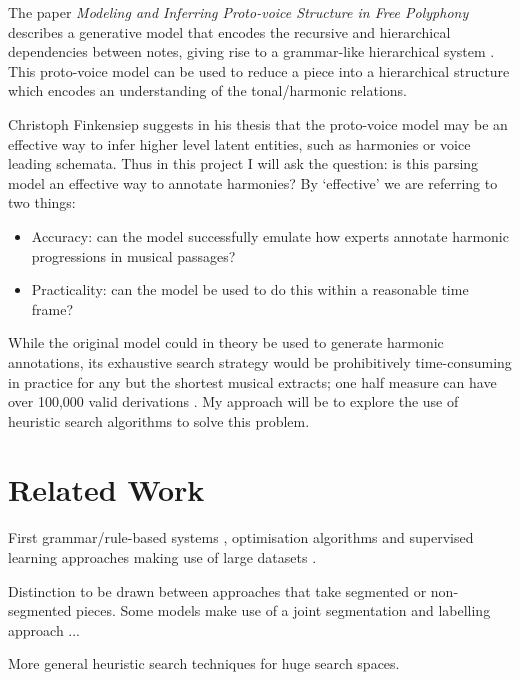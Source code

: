\documentclass[12pt,a4paper,twoside,openright]{report}
\begin{document}
\par
The paper \textit{Modeling and Inferring Proto-voice Structure in Free Polyphony} describes a generative model that encodes the recursive and hierarchical dependencies between notes, giving rise to a grammar-like hierarchical system \cite{finkensiepMODELINGINFERRINGPROTOVOICE2021}. This proto-voice model can be used to reduce a piece into a hierarchical structure which encodes an understanding of the tonal/harmonic relations.
\par
Christoph Finkensiep suggests in his thesis that the proto-voice model may be an effective way to infer higher level latent entities, such as harmonies or voice leading schemata. Thus in this project I will ask the question: is this parsing model an effective way to annotate harmonies? By ‘effective’ we are referring to two things:
\begin{itemize}
  \item Accuracy: can the model successfully emulate how experts annotate harmonic progressions in musical passages? 
  \item Practicality: can the model be used to do this within a reasonable time frame?
\end{itemize}

While the original model could in theory be used to generate harmonic annotations, its exhaustive search strategy would be prohibitively time-consuming in practice for any but the shortest musical extracts; one half measure can have over 100,000 valid derivations \cite{finkensiepStructureFreePolyphony2023}. My approach will be to explore the use of heuristic search algorithms to solve this problem.

\section{Related Work}
First grammar/rule-based systems \cite{maxwellExpertSystemHarmonizing1992} \cite{winogradLinguisticsComputerAnalysis1968}, optimisation algorithms \cite{pardoAlgorithmsChordalAnalysis2002} and supervised learning approaches making use of large datasets \cite{niEndtoendMachineLearning2011} \cite{mcleodModularSystemHarmonic2021} \cite{masadaChordRecognitionSymbolic2018}.
\par
Distinction to be drawn between approaches that take segmented or non-segmented pieces. Some models make use of a joint segmentation and labelling approach \cite{masadaChordRecognitionSymbolic2018}... 

\par
More general heuristic search techniques for huge search spaces.
\end{document}
